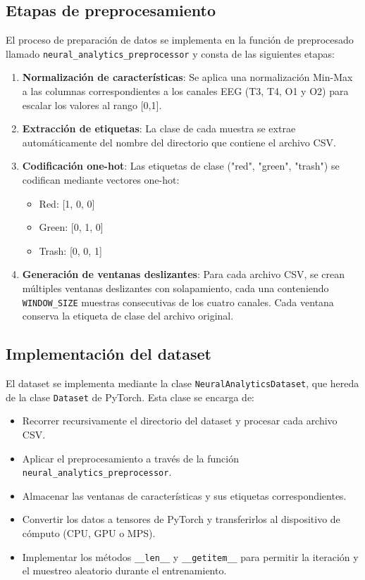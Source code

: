 \subsection{Etapas de preprocesamiento}

El proceso de preparación de datos se implementa en la función de preprocesado llamado \texttt{neural\_analytics\_preprocessor} y consta de las siguientes etapas:

\begin{enumerate}
    \item \textbf{Normalización de características}: Se aplica una normalización Min-Max a las columnas correspondientes a los canales EEG (T3, T4, O1 y O2) para escalar los valores al rango [0,1].
    
    \item \textbf{Extracción de etiquetas}: La clase de cada muestra se extrae automáticamente del nombre del directorio que contiene el archivo CSV.
    
    \item \textbf{Codificación one-hot}: Las etiquetas de clase ("red", "green", "trash") se codifican mediante vectores one-hot:
    \begin{itemize}
        \item Red: [1, 0, 0]
        \item Green: [0, 1, 0]
        \item Trash: [0, 0, 1]
    \end{itemize}
    
    \item \textbf{Generación de ventanas deslizantes}: Para cada archivo CSV, se crean múltiples ventanas deslizantes con solapamiento, cada una conteniendo \texttt{WINDOW\_SIZE} muestras consecutivas de los cuatro canales. Cada ventana conserva la etiqueta de clase del archivo original.
\end{enumerate}

\subsection{Implementación del dataset}

El dataset se implementa mediante la clase \texttt{NeuralAnalyticsDataset}, que hereda de la clase \texttt{Dataset} de PyTorch. Esta clase se encarga de:

\begin{itemize}
    \item Recorrer recursivamente el directorio del dataset y procesar cada archivo CSV.
    \item Aplicar el preprocesamiento a través de la función \texttt{neural\_analytics\_preprocessor}.
    \item Almacenar las ventanas de características y sus etiquetas correspondientes.
    \item Convertir los datos a tensores de PyTorch y transferirlos al dispositivo de cómputo (CPU, GPU o MPS).
    \item Implementar los métodos \texttt{\_\_len\_\_} y \texttt{\_\_getitem\_\_} para permitir la iteración y el muestreo aleatorio durante el entrenamiento.
\end{itemize}


